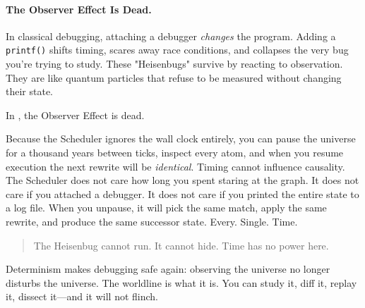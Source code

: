 \paragraph{The Observer Effect Is Dead.}
In classical debugging, attaching a debugger \emph{changes} the program. Adding
a \texttt{printf()} shifts timing, scares away race conditions, and collapses
the very bug you're trying to study. These "Heisenbugs" survive by reacting to
observation. They are like quantum particles that refuse to be measured without changing their state.

In \COMPUTER{}, the Observer Effect is dead.

Because the Scheduler ignores the wall clock entirely, you can pause the
universe for a thousand years between ticks, inspect every atom, and when you resume
execution the next rewrite will be \emph{identical}. Timing cannot influence causality. The Scheduler
does not care how long you spent staring at the graph. It does not care if you attached a debugger.
It does not care if you printed the entire state to a log file. When you unpause, it will pick the
same match, apply the same rewrite, and produce the same successor state. Every. Single. Time.

\begin{quote}
The Heisenbug cannot run. It cannot hide. Time has no power here.
\end{quote}

Determinism makes debugging safe again: observing the universe no longer disturbs the universe. The
worldline is what it is. You can study it, diff it, replay it, dissect it—and it will not flinch.

